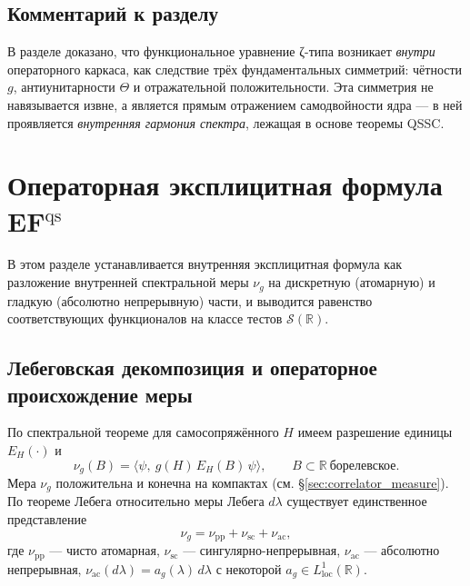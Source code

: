 \documentclass{article}
\numberwithin{equation}{section}
\theoremstyle{plain}
\theoremstyle{definition}
\theoremstyle{remark}
\def\cdot{·}\def\times{×}\def\pm{±}\def\mp{∓}\def\approx{≈}%
\begin{document}
\subsection{Комментарий к разделу}
\label{subsec:summary5}

\noindent
В разделе доказано, что функциональное уравнение ζ-типа возникает \emph{внутри} операторного каркаса,
как следствие трёх фундаментальных симметрий: чётности $g$, антиунитарности $\Theta$ и отражательной положительности.  
Эта симметрия не навязывается извне, а является прямым отражением самодвойности ядра — 
в ней проявляется \emph{внутренняя гармония спектра}, лежащая в основе теоремы QSSC.

\clearpage

\section{Операторная эксплицитная формула EF$^{\mathrm{qs}}$}
\label{sec:EFqs}

\noindent
В этом разделе устанавливается внутренняя эксплицитная формула как разложение
внутренней спектральной меры $\nu_g$ на дискретную (атомарную) и гладкую (абсолютно
непрерывную) части, и выводится равенство соответствующих функционалов на классе тестов
$\mathcal S(\mathbb R)$.

\subsection{Лебеговская декомпозиция и операторное происхождение меры}
\label{subsec:Lebesgue_decomp}

По спектральной теореме для самосопряжённого $H$ имеем разрешение единицы $E_H(\cdot)$ и
\begin{equation}
\label{eq:nu_from_EH}
\nu_g(B)=\big\langle \psi,\ g(H)\,E_H(B)\,\psi\big\rangle,\qquad B\subset\mathbb R\ \text{борелевское.}
\end{equation}
Мера $\nu_g$ положительна и конечна на компактах (см. §\ref{sec:correlator_measure}). По теореме Лебега
относительно меры Лебега $d\lambda$ существует единственное представление ~\cite{ReedSimonI}
\begin{equation}
\label{eq:Lebesgue_decomp}
\nu_g=\nu_{\mathrm{pp}}+\nu_{\mathrm{sc}}+\nu_{\mathrm{ac}},
\end{equation}
где $\nu_{\mathrm{pp}}$ — чисто атомарная, $\nu_{\mathrm{sc}}$ — сингулярно-непрерывная,
$\nu_{\mathrm{ac}}$ — абсолютно непрерывная, $\nu_{\mathrm{ac}}(d\lambda)=a_g(\lambda)\,d\lambda$ с некоторой
$a_g\in L^1_{\mathrm{loc}}(\mathbb R)$.
\end{document}
